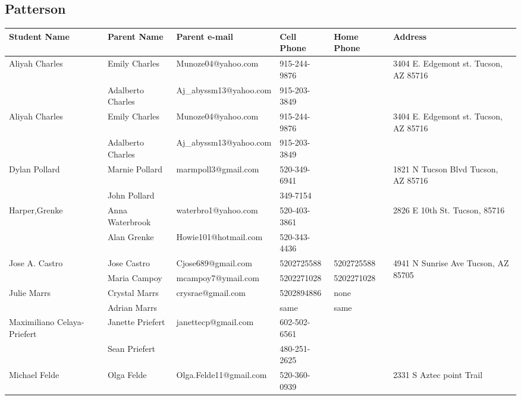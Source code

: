 \documentclass[landscape]{article}\usepackage[]{graphicx}\usepackage[]{color}
\begin{document}
\subsection{Patterson}
\begin{longtable}{|p{100pt}|p{100pt}|p{140pt}|p{60pt}|p{64pt}|p{120pt}|}
\textbf{Student Name} & \textbf{Parent Name} & \textbf{Parent e-mail} & \textbf{Cell Phone} & \textbf{Home Phone} & \textbf{Address}\\
\hline
\hline
\multirow{2}{100pt}{Aliyah Charles} & Emily Charles & Munoze04@yahoo.com & 915-244-9876 &  & \multirow{2}{120pt}{3404 E. Edgemont st. Tucson, AZ 85716} \\
 & Adalberto Charles & Aj\_abyssm13@yahoo.com & 915-203-3849 &  & \\
\hline
\multirow{2}{100pt}{Aliyah Charles} & Emily Charles  & Munoze04@yahoo.com & 915-244-9876 &  & \multirow{2}{120pt}{3404 E. Edgemont st. Tucson, AZ 85716} \\
 & Adalberto Charles & Aj\_abyssm13@yahoo.com & 915-203-3849 &  & \\
\hline
\multirow{2}{100pt}{Dylan Pollard} & Marnie Pollard & marmpoll3@gmail.com & 520-349-6941 &  & \multirow{2}{120pt}{1821 N Tucson Blvd Tucson, AZ 85716} \\
 & John Pollard &  & 349-7154 &  & \\
\hline
\multirow{2}{100pt}{Harper,Grenke} & Anna Waterbrook & waterbro1@yahoo.com & 520-403-3861 &  & \multirow{2}{120pt}{2826 E 10th St. Tucson, 85716} \\
 & Alan Grenke & Howie101@hotmail.com & 520-343-4436 &  & \\
\hline
\multirow{2}{100pt}{Jose A. Castro} & Jose Castro & Cjose689@gmail.com & 5202725588 & 5202725588 & \multirow{2}{120pt}{4941 N Sunrise Ave Tucson, AZ 85705} \\
 & Maria Campoy & mcampoy7@ymail.com & 5202271028 & 5202271028 & \\
\hline
\multirow{2}{100pt}{Julie Marrs} & Crystal Marrs & crysrae@gmail.com & 5202894886 & none & \multirow{2}{120pt}{} \\
 & Adrian Marrs &  & same & same & \\
\hline
\multirow{2}{100pt}{Maximiliano Celaya-Priefert} & Janette Priefert & janettecp@gmail.com & 602-502-6561 &  & \multirow{2}{120pt}{} \\
 & Sean Priefert &  & 480-251-2625 &  & \\
\hline
\multirow{2}{100pt}{Michael Felde} & Olga Felde & Olga.Felde11@gmail.com & 520-360-0939 &  & \multirow{2}{120pt}{2331 S Aztec point Trail} \\

\end{longtable}
\end{document}
